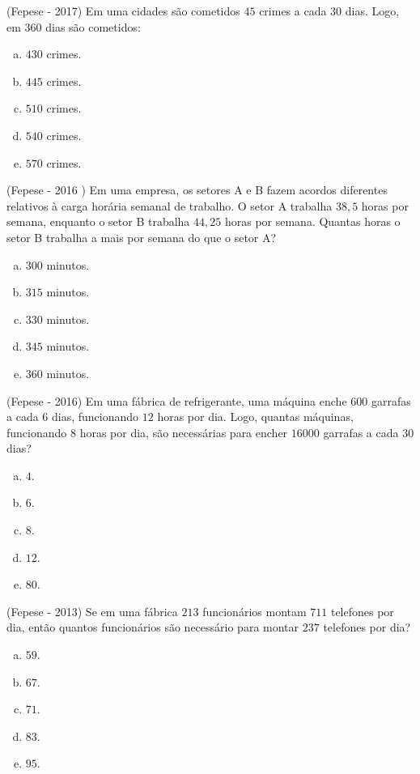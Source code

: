  \begin{exer}
 (Fepese - 2017) Em uma cidades são cometidos $45$ crimes a cada $30$ dias. Logo, em $360$ dias são cometidos:
   \begin{enumerate}[a)]
   \item $430$ crimes.
   \item $445$ crimes.
   \item $510$ crimes.
   \item $540$ crimes.
   \item $570$ crimes.
   \end{enumerate}
 \end{exer} 
 
 \begin{exer}
 (Fepese - 2016 ) Em uma empresa, os setores A e B fazem acordos diferentes relativos à carga horária semanal de trabalho. O setor A trabalha $38,5$ horas por semana, enquanto o setor B trabalha $44,25$ horas por semana. Quantas horas o setor B trabalha a mais por semana do que o setor A?
 \begin{enumerate}[a)]
   \item $300$ minutos.
   \item $315$ minutos.
   \item $330$ minutos.
   \item $345$ minutos.
   \item $360$ minutos.
   \end{enumerate}
 \end{exer} 
 
 \begin{exer}
 (Fepese - 2016) Em uma fábrica de refrigerante, uma máquina enche $600$ garrafas a cada $6$ dias, funcionando $12$ horas por dia. Logo, quantas máquinas, funcionando $8$ horas por dia, são necessárias para encher $16000$ garrafas a cada $30$ dias?
 \begin{enumerate}[a)]
   \item $4$.
   \item $6$.
   \item $8$.
   \item $12$.
   \item $80$.
   \end{enumerate}
 \end{exer} 
 
 \begin{exer}
 (Fepese - 2013) Se em uma fábrica $213$ funcionários montam $711$ telefones por dia, então quantos funcionários são necessário para montar $237$ telefones por dia?
 \begin{enumerate}[a)]
   \item $59$.
   \item $67$.
   \item $71$.
   \item $83$.
   \item $95$.
   \end{enumerate}
 \end{exer} 
 

